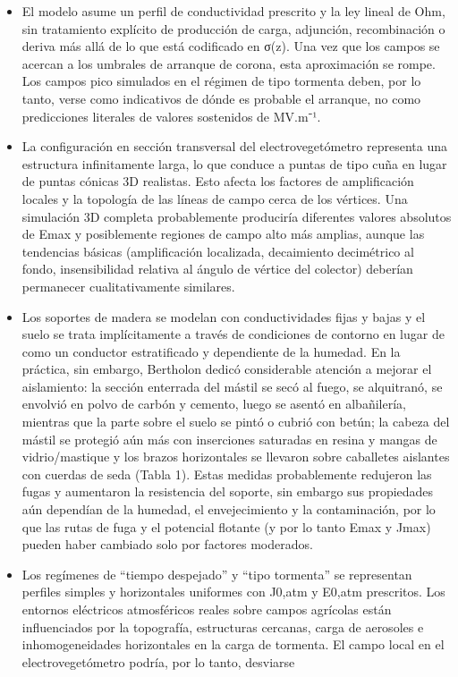 \documentclass[
]{article}
\begin{document}
\begin{itemize}
\item
  El modelo asume un perfil de conductividad prescrito y la ley lineal
  de Ohm, sin tratamiento explícito de producción de carga, adjunción,
  recombinación o deriva más allá de lo que está codificado en σ(z). Una
  vez que los campos se acercan a los umbrales de arranque de corona,
  esta aproximación se rompe. Los campos pico simulados en el régimen de
  tipo tormenta deben, por lo tanto, verse como indicativos de dónde es
  probable el arranque, no como predicciones literales de valores
  sostenidos de MV.m⁻¹.
\item
  La configuración en sección transversal del electrovegetómetro
  representa una estructura infinitamente larga, lo que conduce a puntas
  de tipo cuña en lugar de puntas cónicas 3D realistas. Esto afecta los
  factores de amplificación locales y la topología de las líneas de
  campo cerca de los vértices. Una simulación 3D completa probablemente
  produciría diferentes valores absolutos de Emax y posiblemente
  regiones de campo alto más amplias, aunque las tendencias básicas
  (amplificación localizada, decaimiento decimétrico al fondo,
  insensibilidad relativa al ángulo de vértice del colector) deberían
  permanecer cualitativamente similares.
\item
  Los soportes de madera se modelan con conductividades fijas y bajas y
  el suelo se trata implícitamente a través de condiciones de contorno
  en lugar de como un conductor estratificado y dependiente de la
  humedad. En la práctica, sin embargo, Bertholon dedicó considerable
  atención a mejorar el aislamiento: la sección enterrada del mástil se
  secó al fuego, se alquitranó, se envolvió en polvo de carbón y
  cemento, luego se asentó en albañilería, mientras que la parte sobre
  el suelo se pintó o cubrió con betún; la cabeza del mástil se protegió
  aún más con inserciones saturadas en resina y mangas de
  vidrio/mastique y los brazos horizontales se llevaron sobre caballetes
  aislantes con cuerdas de seda (Tabla 1). Estas medidas probablemente
  redujeron las fugas y aumentaron la resistencia del soporte, sin
  embargo sus propiedades aún dependían de la humedad, el envejecimiento
  y la contaminación, por lo que las rutas de fuga y el potencial
  flotante (y por lo tanto Emax y Jmax) pueden haber cambiado solo por
  factores moderados.
\item
  Los regímenes de ``tiempo despejado'' y ``tipo tormenta'' se
  representan perfiles simples y horizontales uniformes con J0,atm y
  E0,atm prescritos. Los entornos eléctricos atmosféricos reales sobre
  campos agrícolas están influenciados por la topografía, estructuras
  cercanas, carga de aerosoles e inhomogeneidades horizontales en la
  carga de tormenta. El campo local en el electrovegetómetro podría, por
  lo tanto, desviarse
\end{itemize}
\end{document}
